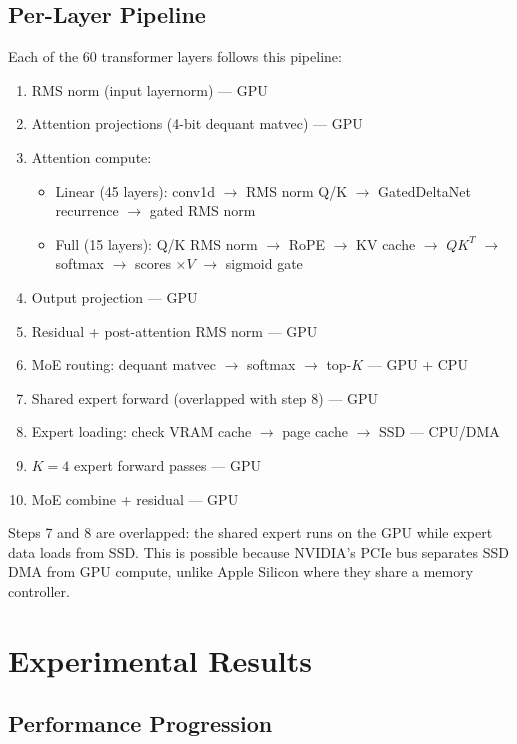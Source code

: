 \documentclass[10pt]{article}
\begin{document}
\subsection{Per-Layer Pipeline}

Each of the 60 transformer layers follows this pipeline:

\begin{enumerate}[nosep]
    \item RMS norm (input layernorm) --- GPU
    \item Attention projections (4-bit dequant matvec) --- GPU
    \item Attention compute:
    \begin{itemize}[nosep]
        \item Linear (45 layers): conv1d $\to$ RMS norm Q/K $\to$ GatedDeltaNet recurrence $\to$ gated RMS norm
        \item Full (15 layers): Q/K RMS norm $\to$ RoPE $\to$ KV cache $\to$ $Q K^T$ $\to$ softmax $\to$ scores $\times V$ $\to$ sigmoid gate
    \end{itemize}
    \item Output projection --- GPU
    \item Residual + post-attention RMS norm --- GPU
    \item MoE routing: dequant matvec $\to$ softmax $\to$ top-$K$ --- GPU + CPU
    \item Shared expert forward (overlapped with step 8) --- GPU
    \item Expert loading: check VRAM cache $\to$ page cache $\to$ SSD --- CPU/DMA
    \item $K=4$ expert forward passes --- GPU
    \item MoE combine + residual --- GPU
\end{enumerate}

Steps 7 and 8 are overlapped: the shared expert runs on the GPU while expert data loads from SSD. This is possible because NVIDIA's PCIe bus separates SSD DMA from GPU compute, unlike Apple Silicon where they share a memory controller.

\section{Experimental Results}

\subsection{Performance Progression}
\end{document}
